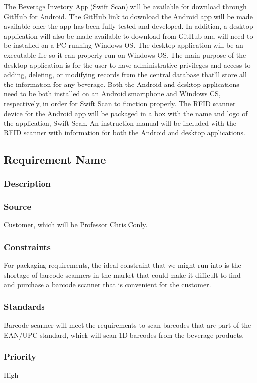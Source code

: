 The Beverage Invetory App (Swift Scan) will be available for download through GitHub for Android.  The GitHub link to download the Android app will be made available once the app has been fully tested and developed.  In addition, a desktop application will also be made available to download from GitHub and will need to be installed on a PC running Windows OS.  The desktop application will be an executable file so it can properly run on Windows OS.  The main purpose of the desktop application is for the user to have administrative privileges and access to adding, deleting, or modifying records from the central database that'll store all the information for any beverage.  Both the Android and desktop applications need to be both installed on an Android smartphone and Windows OS, respectively, in order for Swift Scan to function properly.  The RFID scanner device for the Android app will be packaged in a box with the name and logo of the application, Swift Scan.  An instruction manual will be included with the RFID scanner with information for both the Android and desktop applications.

\subsection{Requirement Name}
\subsubsection{Description}

\subsubsection{Source}
Customer, which will be Professor Chris Conly.
\subsubsection{Constraints}
For packaging requirements, the ideal constraint that we might run into is the shortage of barcode scanners in the market that could make it difficult to find and purchase a barcode scanner that is convenient for the customer.
\subsubsection{Standards}
Barcode scanner will meet the requirements to scan barcodes that are part of the EAN/UPC standard, which will scan 1D barcodes from the beverage products.
\subsubsection{Priority}
High
